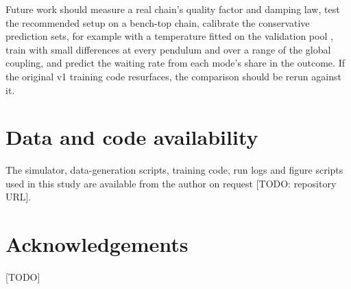 \documentclass[11pt]{article}
\begin{document}
Future work should measure a real chain's quality factor and damping law, test the recommended setup on a bench-top chain, calibrate the conservative prediction sets, for example with a temperature fitted on the validation pool \cite{guo2017calibration}, train with small differences at every pendulum and over a range of the global coupling, and predict the waiting rate from each mode's share in the outcome. If the original v1 training code resurfaces, the comparison should be rerun against it.

\section*{Data and code availability}

The simulator, data-generation scripts, training code, run logs and figure scripts used in this study are available from the author on request [TODO: repository URL].

\section*{Acknowledgements}

[TODO]



\end{document}
